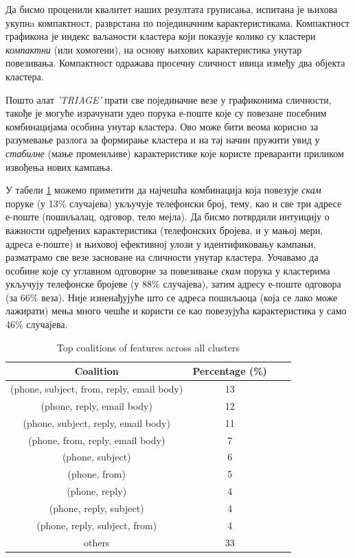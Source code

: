 \documentclass[a4paper]{article}
\begin{document}
Да бисмо проценили квалитет наших резултата груписања, испитана је њихова укупнa компактност, разврстана по појединачним карактеристикама. Компактност графикона је индекс ваљаности кластера који показује колико су кластери \emph{компактни} (или хомогени), на основу њихових карактеристика унутар повезивања. Компактност одражава просечну сличност ивица између два објекта кластера.

Пошто алат \emph{'TRIAGE'} прати све појединачне везе у графиконима сличности, такође је могуће израчунати удео порука е-поште које су повезане посебним комбинацијама особина унутар кластера. Ово може бити веома корисно за разумевање разлога за формирање кластера и на тај начин пружити увид у \emph{стабилне} (мање променљиве) карактеристике које користе преваранти приликом извођења нових кампања.

У табели \ref{tab:tabela5} можемо приметити да најчешћа комбинација која повезује \emph{скам} поруке (у 13\% случајева) укључује телефонски број, тему, као и све три адресе е-поште (пошиљалац, одговор, тело мејла). Да бисмо потврдили интуицију о важности одређених карактеристика (телефонских бројева, и у мањој мери, адреса е-поште) и њиховој ефективној улози у идентификовању кампањи, разматрамо све везе засноване на сличности унутар кластера. Уочавамо да особине које су углавном одговорне за повезивање \emph{скам} порука у кластерима укључују телефонске бројеве (у 88\% случајева), затим адресу е-поште одговора (за 66\% веза). Није изненађујуће што се адреса пошиљаоца (која се лако може лажирати) мења много чешће и користи се као повезујућа карактеристика у само 46\% случајева.

\begin{table}[h!]
\begin{center}
\caption{Top coalitions of features across all clusters}
\begin{tabular}{|c|c|c|c|} \hline
\textbf{Coalition} & \textbf{Percentage (\%)}\\ \hline
(phone, subject, from, reply, email body) & 13\\ \hline
(phone, reply, email body) & 12\\ \hline
(phone, subject, reply, email body) & 11\\ \hline
(phone, from, reply, email body) & 7\\ \hline
(phone, subject) & 6\\ \hline
(phone, from) & 5\\ \hline
(phone, reply) & 4\\ \hline
(phone, reply, subject) & 4\\ \hline
(phone, reply, subject, from) & 4\\ \hline
others & 33\\ \hline
\end{tabular}
\label{tab:tabela5}
\end{center}
\end{table}
\end{document}
